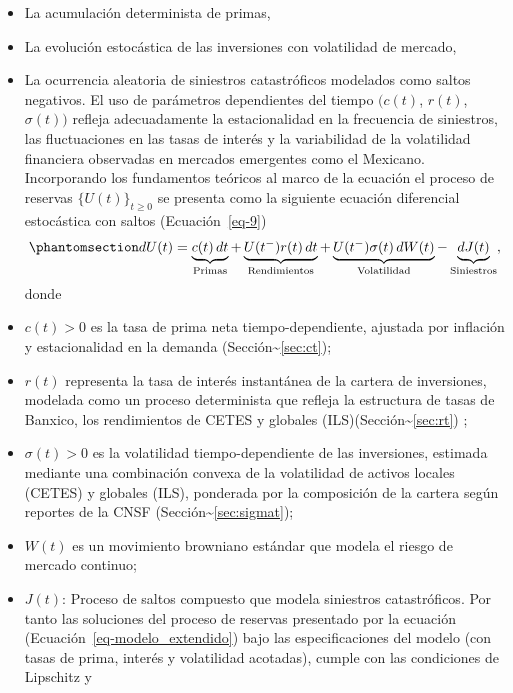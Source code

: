 \documentclass[
  spanish,
  us-letterpaper,
]{scrreprt}
\theoremstyle{plain}
\theoremstyle{plain}
\theoremstyle{definition}
\theoremstyle{remark}
\begin{document}
\begin{itemize}
\item
  La acumulación determinista de primas,
\item
  La evolución estocástica de las inversiones con volatilidad de
  mercado,
\item
  La ocurrencia aleatoria de siniestros catastróficos modelados como
  saltos negativos. El uso de parámetros dependientes del tiempo
  \((c(t)\), \(r(t)\), \(\sigma(t))\) refleja adecuadamente la
  estacionalidad en la frecuencia de siniestros, las fluctuaciones en
  las tasas de interés y la variabilidad de la volatilidad financiera
  observadas en mercados emergentes como el Mexicano. Incorporando los
  fundamentos teóricos al marco de la ecuación el proceso de reservas
  \(\{U(t)\}_{t \geq 0}\) se presenta como la siguiente ecuación
  diferencial estocástica con saltos (Ecuación~\ref{eq-9})
  \begin{equation}\protect\phantomsection\label{eq-modelo_extendido}{dU(t) = \underbrace{c(t)\,dt}_{\text{Primas}} + \underbrace{U(t^-)r(t)\,dt}_{\text{Rendimientos}} + \underbrace{U(t^-)\sigma(t)\,dW(t)}_{\text{Volatilidad}} - \underbrace{dJ(t)}_{\text{Siniestros}},}\end{equation}
  donde
\item
  \(c(t) > 0\) es la tasa de prima neta tiempo-dependiente, ajustada por
  inflación y estacionalidad en la demanda
  (Sección\textasciitilde{}\ref{sec:ct});
\item
  \(r(t)\) representa la tasa de interés instantánea de la cartera de
  inversiones, modelada como un proceso determinista que refleja la
  estructura de tasas de Banxico, los rendimientos de CETES y globales
  (ILS)(Sección\textasciitilde{}\ref{sec:rt}) ;
\item
  \(\sigma(t) > 0\) es la volatilidad tiempo-dependiente de las
  inversiones, estimada mediante una combinación convexa de la
  volatilidad de activos locales (CETES) y globales (ILS), ponderada por
  la composición de la cartera según reportes de la CNSF
  (Sección\textasciitilde{}\ref{sec:sigmat});
\item
  \(W(t)\) es un movimiento browniano estándar que modela el riesgo de
  mercado continuo;
\item
  \(J(t)\): Proceso de saltos compuesto que modela siniestros
  catastróficos. Por tanto las soluciones del proceso de reservas
  presentado por la ecuación (Ecuación~\ref{eq-modelo_extendido}) bajo
  las especificaciones del modelo (con tasas de prima, interés y
  volatilidad acotadas), cumple con las condiciones de Lipschitz y

\end{itemize}
\end{document}
